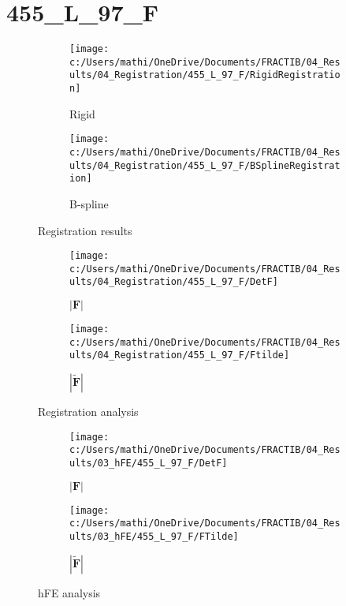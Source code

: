 \documentclass{article}%
\begin{document}
%
\newpage%
\section*{455\_L\_97\_F}%
\label{sec:455L97F}%


\begin{figure}[h!]%
\begin{subfigure}[b]{0.5\linewidth}%
\texttt{[image: c:/Users/mathi/OneDrive/Documents/FRACTIB/04\_Results/04\_Registration/455\_L\_97\_F/RigidRegistration]}%
\caption{Rigid}%
\end{subfigure}%
\begin{subfigure}[b]{0.5\linewidth}%
\texttt{[image: c:/Users/mathi/OneDrive/Documents/FRACTIB/04\_Results/04\_Registration/455\_L\_97\_F/BSplineRegistration]}%
\caption{B{-}spline}%
\end{subfigure}%
\caption{Registration results}%
\end{figure}

%


\begin{figure}[h!]%
\begin{subfigure}[b]{0.5\linewidth}%
\texttt{[image: c:/Users/mathi/OneDrive/Documents/FRACTIB/04\_Results/04\_Registration/455\_L\_97\_F/DetF]}%
\caption{$|\mathbf{F}|$}%
\end{subfigure}%
\begin{subfigure}[b]{0.5\linewidth}%
\texttt{[image: c:/Users/mathi/OneDrive/Documents/FRACTIB/04\_Results/04\_Registration/455\_L\_97\_F/Ftilde]}%
\caption{$|\widetilde{\mathbf{F}}|$}%
\end{subfigure}%
\caption{Registration analysis}%
\end{figure}

%


\begin{figure}[h!]%
\begin{subfigure}[b]{0.5\linewidth}%
\texttt{[image: c:/Users/mathi/OneDrive/Documents/FRACTIB/04\_Results/03\_hFE/455\_L\_97\_F/DetF]}%
\caption{$|\mathbf{F}|$}%
\end{subfigure}%
\begin{subfigure}[b]{0.5\linewidth}%
\texttt{[image: c:/Users/mathi/OneDrive/Documents/FRACTIB/04\_Results/03\_hFE/455\_L\_97\_F/FTilde]}%
\caption{$|\widetilde{\mathbf{F}}|$}%
\end{subfigure}%
\caption{hFE analysis}%
\end{figure}
\end{document}
